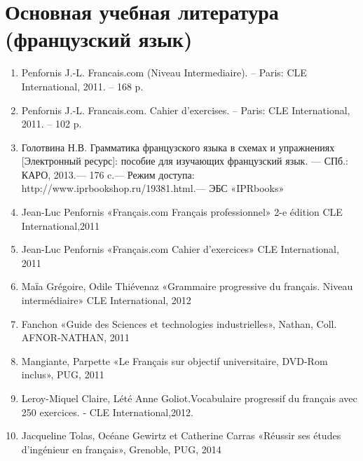 \section{Основная учебная литература (французский язык)}
\begin{enumerate}
\item Penfornis J.-L. Francais.com (Niveau Intermediaire). – Paris: CLE International, 2011. – 168 p.
\item Penfornis J.-L. Francais.com. Cahier d’exercises. – Paris: CLE International, 2011. – 102 p.
\item Голотвина Н.В. Грамматика французского языка в схемах и упражнениях [Электронный ресурс]: пособие для изучающих французский язык. — СПб.: КАРО, 2013.— 176 c.— Режим доступа: http://www.iprbookshop.ru/19381.html.— ЭБС «IPRbooks» 
\item Jean-Luc Penfornis «Français.com Français professionnel» 2-e édition CLE International,2011
\item Jean-Luc Penfornis «Français.com Cahier d’exercices» CLE International, 2011
\item Maїa Grégoire, Odile Thiévenaz «Grammaire progressive du français. Niveau intermédiaire» CLE International, 2012
\item Fanchon «Guide des Sciences et technologies industrielles», Nathan, Coll. AFNOR-NATHAN, 2011
\item Mangiante, Parpette «Le Français sur objectif universitaire, DVD-Rom inclus», PUG, 2011
\item Leroy-Miquel Claire, Lété Anne Goliot.Vocabulaire progressif du français avec 250 exercices. - CLE International,2012.
\item Jacqueline Tolas, Océane Gewirtz et Catherine Carras «Réussir ses études d’ingénieur en français», Grenoble, PUG, 2014
\end{enumerate}
